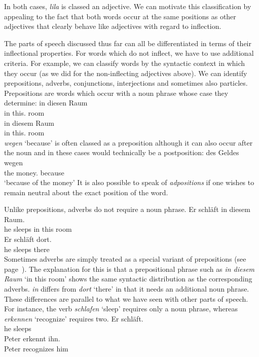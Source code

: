 {\noindent
In both cases, \emph{lila} is classed an adjective. We can motivate this classification by appealing to the fact that both words occur
at the same positions as other adjectives that clearly behave like adjectives with regard to inflection.

The parts of speech discussed thus far can all be differentiated in terms of their inflectional properties. For words which do not inflect,
we have to use additional criteria. For example, we can classify words by the syntactic context in which they occur (as we did for the 
non-inflecting adjectives above). We can identify prepositions, adverbs,
conjunctions, interjections and sometimes also particles.
Prepositions are words which occur with a noun phrase whose case they determine:
\eal
\ex 
\gll in diesen Raum\\
	 in this.\acc{} room\\
\ex 
\gll in diesem Raum\\
	 in this.\dat{} room\\
\zl
\emph{wegen} `because' is often classed as a preposition although it can also occur after the noun and in these cases would technically be a
postposition:
\ea
\gll des Geldes wegen\\
	 the money.\gen{} because\\
\glt `because of the money'
\z
It is also possible to speak of \emph{adpositions} if one wishes to remain neutral about the exact position of the word.

Unlike prepositions, adverbs do not require a noun phrase. 
\eal
\ex
\gll Er schläft in diesem Raum.\\
	 he sleeps in this room\\
\ex
\gll Er schläft dort.\\
	 he sleeps there\\
\zl
Sometimes adverbs are simply treated as a special variant of prepositions (see page~\pageref{Seite-Adverbien-PP}). The explanation for this is that
a prepositional phrase such as \emph{in diesem Raum} `in this room' shows the same syntactic
distribution as the corresponding adverbs. \emph{in} differs
from \emph{dort} `there' in that it needs an additional noun phrase. These differences are
parallel to what we have seen with other parts of speech. For instance, the verb \emph{schlafen} `sleep' requires only a noun phrase, whereas \emph{erkennen} `recognize' requires two.
\eal
\ex 
\gll Er schläft.\\
     he sleeps\\
\ex 
\gll Peter erkennt ihn.\\
     Peter recognizes him\\
\zl


}
